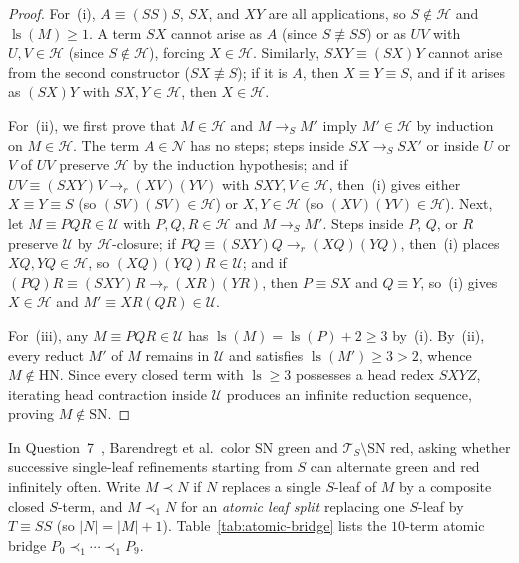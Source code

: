 \documentclass[11pt,reqno]{amsart}
\numberwithin{equation}{section}
\theoremstyle{plain}
\theoremstyle{definition}
\theoremstyle{remark}
\DeclareMathOperator{\ls}{ls}
\newcommand{\TS}{\mathcal{T}_S}
\newcommand{\SN}{\mathrm{SN}}
\newcommand{\HN}{\mathrm{HN}}
\newcommand{\redS}{\to_S}
\begin{document}
\begin{proof}
For~(i), $A \equiv (S S) S$, $S X$, and $X Y$ are all applications, so $S \notin \mathcal{H}$ and $\ls(M) \ge 1$. A term $S X$ cannot arise as $A$ (since $S \not\equiv S S$) or as $U V$ with $U, V \in \mathcal{H}$ (since $S \notin \mathcal{H}$), forcing $X \in \mathcal{H}$. Similarly, $S X Y \equiv (S X) Y$ cannot arise from the second constructor ($S X \not\equiv S$); if it is $A$, then $X \equiv Y \equiv S$, and if it arises as $(S X) Y$ with $S X, Y \in \mathcal{H}$, then $X \in \mathcal{H}$.

For~(ii), we first prove that $M \in \mathcal{H}$ and $M \redS M'$ imply $M' \in \mathcal{H}$ by induction on $M \in \mathcal{H}$. The term $A \in \mathcal{N}$ has no steps; steps inside $S X \redS S X'$ or inside $U$ or $V$ of $U V$ preserve $\mathcal{H}$ by the induction hypothesis; and if $U V \equiv (S X Y) V \to_r (X V)(Y V)$ with $S X Y, V \in \mathcal{H}$, then~(i) gives either $X \equiv Y \equiv S$ (so $(S V)(S V) \in \mathcal{H}$) or $X, Y \in \mathcal{H}$ (so $(X V)(Y V) \in \mathcal{H}$). Next, let $M \equiv P Q R \in \mathcal{U}$ with $P, Q, R \in \mathcal{H}$ and $M \redS M'$. Steps inside $P$, $Q$, or $R$ preserve $\mathcal{U}$ by $\mathcal{H}$-closure; if $P Q \equiv (S X Y) Q \to_r (X Q)(Y Q)$, then~(i) places $X Q, Y Q \in \mathcal{H}$, so $(X Q)(Y Q) R \in \mathcal{U}$; and if $(P Q) R \equiv (S X Y) R \to_r (X R)(Y R)$, then $P \equiv S X$ and $Q \equiv Y$, so~(i) gives $X \in \mathcal{H}$ and $M' \equiv X R (Q R) \in \mathcal{U}$.

For~(iii), any $M \equiv P Q R \in \mathcal{U}$ has $\ls(M) = \ls(P) + 2 \ge 3$ by~(i). By~(ii), every reduct $M'$ of $M$ remains in $\mathcal{U}$ and satisfies $\ls(M') \ge 3 > 2$, whence $M \notin \HN$. Since every closed term with $\ls \ge 3$ possesses a head redex $S X Y Z$, iterating head contraction inside $\mathcal{U}$ produces an infinite reduction sequence, proving $M \notin \SN$.
\end{proof}

In Question~7~\cite[p.~81]{BarendregtEndrullisKlopWaldmann2017}, Barendregt et al.\ color $\SN$ green and $\TS \setminus \SN$ red, asking whether successive single-leaf refinements starting from $S$ can alternate green and red infinitely often. Write $M \prec N$ if $N$ replaces a single $S$-leaf of $M$ by a composite closed $S$-term, and $M \prec_1 N$ for an \emph{atomic leaf split} replacing one $S$-leaf by $T \equiv S S$ (so $|N| = |M| + 1$). Table~\ref{tab:atomic-bridge} lists the $10$-term atomic bridge $P_0 \prec_1 \cdots \prec_1 P_9$.
\end{document}
